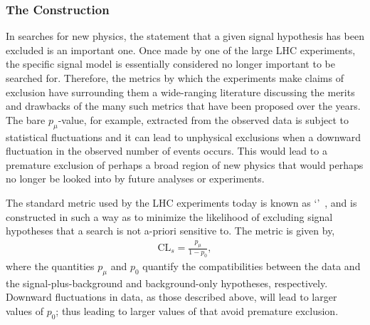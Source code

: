 %
%

\subsubsection{The \cls Construction}
\label{sec:cls_method}

In searches for new physics, the statement that a given signal hypothesis has been excluded
is an important one.
Once made by one of the large LHC experiments, the specific signal model is essentially considered
no longer important to be searched for.
Therefore, the metrics by which the experiments make claims of exclusion have surrounding them
a wide-ranging literature discussing the merits and drawbacks of the many such metrics
that have been proposed over the years.
The bare $p_{\mu}$-value, for example, extracted from the observed data is subject to statistical fluctuations
and it can lead to unphysical exclusions when a downward fluctuation in the observed
number of events occurs.
This would lead to a premature exclusion of perhaps a broad region of new physics
that would perhaps no longer be looked into by future analyses or experiments.

The standard metric used by the LHC experiments today is known as `\cls'~\cite{CLSReadI,CLSReadII},
and is constructed in such a way as to minimize the likelihood of excluding signal
hypotheses that a search is not a-priori sensitive to.
The \cls metric is given by,
\begin{align}
    \text{CL}_s = \frac{p_{\mu}}{1-p_0},
    \label{eq:cls_def}
\end{align}
where the quantities $p_{\mu}$ and $p_0$ quantify the compatibilities between the data and the signal-plus-background
and background-only hypotheses, respectively.
Downward fluctuations in data, as those described above, will lead to larger values of $p_0$; thus
leading to larger values of \cls that avoid premature exclusion.

